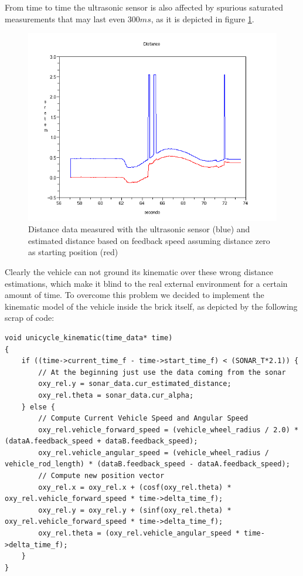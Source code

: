 From time to time the ultrasonic sensor is also affected by spurious saturated measurements that may last even $300ms$, as it is depicted in figure \ref{fig:sonar01}. 

\begin{figure}[H]
  \begin{center}
  \includegraphics[scale=0.51]{FIGURES_3/Sonar01.png}
    \caption[Trigonometry]{Distance data measured with the ultrasonic sensor (blue) and estimated distance based on feedback speed assuming distance zero as starting position (red)}
    \label{fig:sonar01}
  \end{center}
\end{figure}

Clearly the vehicle can not ground its kinematic over these wrong distance estimations, which make it blind to the real external environment for a certain amount of time. To overcome this problem we decided to implement the kinematic model of the vehicle inside the brick itself, as depicted by the following scrap of code:

\begin{lstlisting}
void unicycle_kinematic(time_data* time)
{
    if ((time->current_time_f - time->start_time_f) < (SONAR_T*2.1)) {
        // At the beginning just use the data coming from the sonar
        oxy_rel.y = sonar_data.cur_estimated_distance;
        oxy_rel.theta = sonar_data.cur_alpha;
    } else {
        // Compute Current Vehicle Speed and Angular Speed
        oxy_rel.vehicle_forward_speed = (vehicle_wheel_radius / 2.0) * (dataA.feedback_speed + dataB.feedback_speed);
        oxy_rel.vehicle_angular_speed = (vehicle_wheel_radius / vehicle_rod_length) * (dataB.feedback_speed - dataA.feedback_speed);
        // Compute new position vector
        oxy_rel.x = oxy_rel.x + (cosf(oxy_rel.theta) * oxy_rel.vehicle_forward_speed * time->delta_time_f);
        oxy_rel.y = oxy_rel.y + (sinf(oxy_rel.theta) * oxy_rel.vehicle_forward_speed * time->delta_time_f);
        oxy_rel.theta = (oxy_rel.vehicle_angular_speed * time->delta_time_f);
    }
}
\end{lstlisting}

